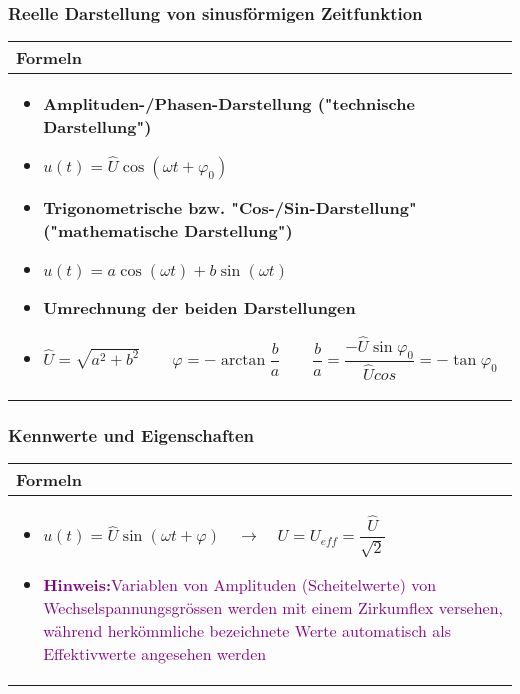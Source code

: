 \subsubsection{Reelle Darstellung von sinusförmigen Zeitfunktion}
\begin{tabular}{ | m{18cm}  | }
	\hline
	Formeln \\ \hline
	\hline
	
	\begin{itemize}	
		\item \textbf{Amplituden-/Phasen-Darstellung ("technische Darstellung")}
		\item[] $u(t)=\hat{U}\cos(\omega t+\varphi_0)$
		\item \textbf{Trigonometrische bzw. "Cos-/Sin-Darstellung" ("mathematische Darstellung")}
		\item[] $u(t)=a\cos(\omega t)+b\sin(\omega t)$
		\item \textbf{Umrechnung der beiden Darstellungen}
		\item[] $\hat{U}=\sqrt{a^2+b^2}\qquad \varphi=-\arctan\dfrac{b}{a}\qquad \dfrac{b}{a}=\dfrac{-\hat{U}\sin\varphi_0}{\hat{U}cos}=-\tan\varphi_0$
	\end{itemize}   	
	\\ \hline
\end{tabular}

\subsubsection{Kennwerte und Eigenschaften}
\begin{tabular}{ | m{18cm}  | }
	\hline
	Formeln \\ \hline
	\hline
	
	\begin{itemize}	
		\item[] $u(t)=\hat{U}\sin(\omega t+\varphi) \quad \rightarrow \quad U=U_{eff}=\dfrac{\hat{U}}{\sqrt{2}}$
		\item[] \textcolor{purple}{\textbf{Hinweis:}Variablen von Amplituden (Scheitelwerte) von Wechselspannungsgrössen  werden mit einem Zirkumflex versehen, während herkömmliche bezeichnete Werte automatisch als Effektivwerte angesehen werden}
	\end{itemize}   	
	\\ \hline
\end{tabular}

\newpage

